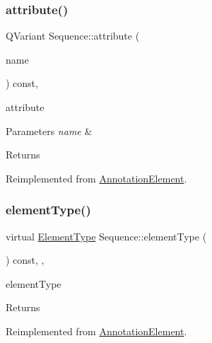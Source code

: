 \subsubsection{\texorpdfstring{attribute()}{attribute()}}
{\footnotesize\ttfamily Q\+Variant Sequence\+::attribute (\begin{DoxyParamCaption}\item[{const Q\+String \&}]{name }\end{DoxyParamCaption}) const\hspace{0.3cm}{\ttfamily [override]}, {\ttfamily [virtual]}}



attribute 


\begin{DoxyParams}{Parameters}
{\em name} & \\
\hline
\end{DoxyParams}
\begin{DoxyReturn}{Returns}

\end{DoxyReturn}


Reimplemented from \hyperlink{class_annotation_element_a55f85fb15ed52122653b0769c857899c}{Annotation\+Element}.

\mbox{\label{class_sequence_a09f57e396cbb4a9de8caa81ca3b96ad1}} 
\subsubsection{\texorpdfstring{element\+Type()}{elementType()}}
{\footnotesize\ttfamily virtual \hyperlink{class_annotation_element_af5282990ffbe25eeea8ab02037e344b0}{Element\+Type} Sequence\+::element\+Type (\begin{DoxyParamCaption}{ }\end{DoxyParamCaption}) const\hspace{0.3cm}{\ttfamily [inline]}, {\ttfamily [override]}, {\ttfamily [virtual]}}



element\+Type 

\begin{DoxyReturn}{Returns}

\end{DoxyReturn}


Reimplemented from \hyperlink{class_annotation_element_a9b2d5cf05a2f81d9b2103a5c736dfb2d}{Annotation\+Element}.

